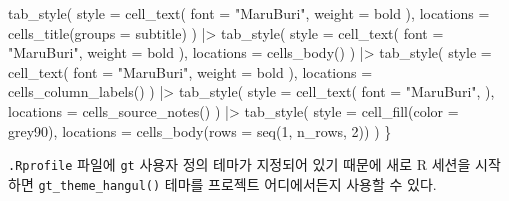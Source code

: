 \documentclass[
  letterpaper,
]{book}
\newenvironment{Shaded}{\begin{snugshade}}{\end{snugshade}}
\newcommand{\AttributeTok}[1]{\textcolor[rgb]{0.40,0.45,0.13}{#1}}
\newcommand{\DecValTok}[1]{\textcolor[rgb]{0.68,0.00,0.00}{#1}}
\newcommand{\FunctionTok}[1]{\textcolor[rgb]{0.28,0.35,0.67}{#1}}
\newcommand{\NormalTok}[1]{\textcolor[rgb]{0.00,0.23,0.31}{#1}}
\newcommand{\SpecialCharTok}[1]{\textcolor[rgb]{0.37,0.37,0.37}{#1}}
\newcommand{\StringTok}[1]{\textcolor[rgb]{0.13,0.47,0.30}{#1}}
\begin{document}
\begin{Shaded}
\begin{Highlighting}[]
    \FunctionTok{tab\_style}\NormalTok{(}
      \AttributeTok{style =} \FunctionTok{cell\_text}\NormalTok{(}
        \AttributeTok{font =} \StringTok{"MaruBuri"}\NormalTok{,}
        \AttributeTok{weight =} \StringTok{\textquotesingle{}bold\textquotesingle{}}
\NormalTok{      ),}
      \AttributeTok{locations =} \FunctionTok{cells\_title}\NormalTok{(}\AttributeTok{groups =} \StringTok{\textquotesingle{}subtitle\textquotesingle{}}\NormalTok{)}
\NormalTok{    ) }\SpecialCharTok{|\textgreater{}}
    \FunctionTok{tab\_style}\NormalTok{(}
      \AttributeTok{style =} \FunctionTok{cell\_text}\NormalTok{(}
        \AttributeTok{font =} \StringTok{"MaruBuri"}\NormalTok{,}
        \AttributeTok{weight =} \StringTok{\textquotesingle{}bold\textquotesingle{}}
\NormalTok{      ),}
      \AttributeTok{locations =} \FunctionTok{cells\_body}\NormalTok{()}
\NormalTok{    ) }\SpecialCharTok{|\textgreater{}}
    \FunctionTok{tab\_style}\NormalTok{(}
      \AttributeTok{style =} \FunctionTok{cell\_text}\NormalTok{(}
        \AttributeTok{font =} \StringTok{"MaruBuri"}\NormalTok{,}
        \AttributeTok{weight =} \StringTok{\textquotesingle{}bold\textquotesingle{}}
\NormalTok{      ),}
      \AttributeTok{locations =} \FunctionTok{cells\_column\_labels}\NormalTok{()}
\NormalTok{    ) }\SpecialCharTok{|\textgreater{}}
    \FunctionTok{tab\_style}\NormalTok{(}
      \AttributeTok{style =} \FunctionTok{cell\_text}\NormalTok{(}
        \AttributeTok{font =} \StringTok{"MaruBuri"}\NormalTok{,}
\NormalTok{      ),}
      \AttributeTok{locations =} \FunctionTok{cells\_source\_notes}\NormalTok{()}
\NormalTok{    ) }\SpecialCharTok{|\textgreater{}}
    \FunctionTok{tab\_style}\NormalTok{(}
      \AttributeTok{style =} \FunctionTok{cell\_fill}\NormalTok{(}\AttributeTok{color =} \StringTok{\textquotesingle{}grey90\textquotesingle{}}\NormalTok{),}
      \AttributeTok{locations =} \FunctionTok{cells\_body}\NormalTok{(}\AttributeTok{rows =} \FunctionTok{seq}\NormalTok{(}\DecValTok{1}\NormalTok{, n\_rows, }\DecValTok{2}\NormalTok{))}
\NormalTok{    )}
\NormalTok{\}}
\end{Highlighting}
\end{Shaded}

\texttt{.Rprofile} 파일에 \texttt{gt} 사용자 정의 테마가 지정되어 있기
때문에 새로 R 세션을 시작하면 \texttt{gt\_theme\_hangul()} 테마를
프로젝트 어디에서든지 사용할 수 있다.
\end{document}
